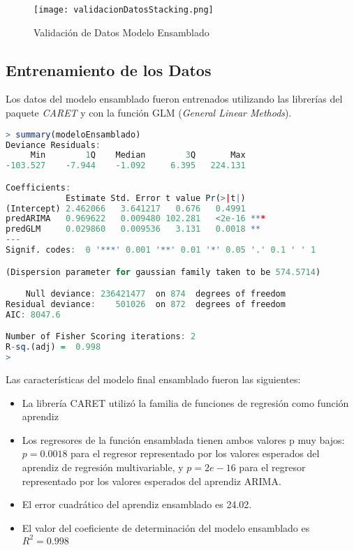 \begin{figure}[H]
    \centering
    \texttt{[image: validacionDatosStacking.png]}
    \caption{Validación de Datos Modelo Ensamblado}
\end{figure}   

\subsection{Entrenamiento de los Datos}
Los datos del modelo ensamblado fueron entrenados utilizando las librerías del paquete \emph{CARET} y con la función GLM (\emph{General Linear Methods}). 

\begin{lstlisting}[language=R]
> summary(modeloEnsamblado)
Deviance Residuals: 
     Min        1Q    Median        3Q       Max  
-103.527    -7.944    -1.092     6.395   224.131  

Coefficients:
            Estimate Std. Error t value Pr(>|t|)    
(Intercept) 2.462066   3.641217   0.676   0.4991    
predARIMA   0.969622   0.009480 102.281   <2e-16 ***
predGLM     0.029860   0.009536   3.131   0.0018 ** 
---
Signif. codes:  0 '***' 0.001 '**' 0.01 '*' 0.05 '.' 0.1 ' ' 1

(Dispersion parameter for gaussian family taken to be 574.5714)

    Null deviance: 236421477  on 874  degrees of freedom
Residual deviance:    501026  on 872  degrees of freedom
AIC: 8047.6

Number of Fisher Scoring iterations: 2
R-sq.(adj) =  0.998
> 
\end{lstlisting}

Las características del modelo final ensamblado fueron las siguientes:

\begin{itemize}
  \item La librería CARET utilizó la familia de funciones de regresión como función aprendiz 
  \item Los regresores de la función ensamblada tienen ambos valores p muy bajos: $p = 0.0018$ para el regresor representado por los valores esperados del aprendiz de regresión multivariable, y $p = 2e-16$ para el regresor representado por los valores esperados del aprendiz ARIMA.
  \item El error cuadrático del aprendiz ensamblado es 24.02.
  \item El valor del coeficiente de determinación del modelo ensamblado es $R^2 = 0.998$
\end{itemize}

